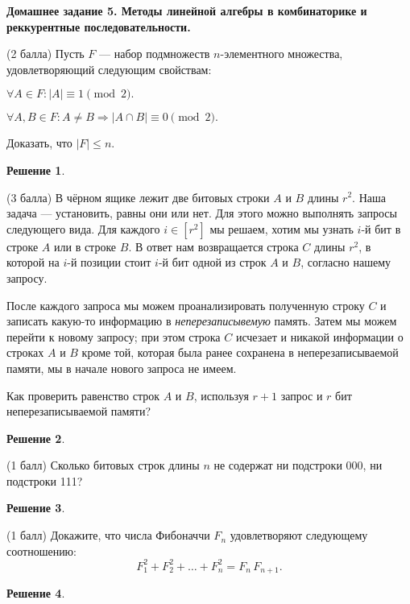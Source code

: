 \documentclass[12pt,fleqn,a4paper]{article}
\newtheorem*{solution}{Решение}
\newenvironment{task}[2] {
	\noindent\fbox{\bf {#1} {#2}.}
}{
}
\newcommand{\mytitle}[2] {
  \begin{center}
      \bf {#1} {#2}.
  \end{center}
}
\let\origenumerate\enumerate
\let\origendenumerate\endenumerate
\renewenvironment{enumerate}{\origenumerate[topsep = 0pt, noitemsep]}{\origendenumerate}
\begin{document}
	\mytitle{Домашнее задание 5.}{Методы линейной алгебры в комбинаторике и реккурентные последовательности}
	\begin{task}{DM}{54}
		(2 балла) Пусть $F$ — набор подмножеств $n$-элементного множества, удовлетворяющий следующим свойствам: 
		        \begin{enumerate}
		                \item $\forall A \in F: |A| \equiv 1 \pmod{2}.$
		                \item $\forall A, B \in F: A \neq B \Rightarrow |A \cap B| \equiv 0 \pmod{2}.$
		        \end{enumerate}
		
		        Доказать, что $|F| \leq n$.
	\end{task}
	\begin{solution}
	\end{solution}

	\begin{task}{DM}{55}
		(3 балла) В чёрном ящике лежит две битовых строки $A$ и $B$ длины $r^2$. Наша задача — установить, равны они или нет.
		Для этого можно выполнять запросы следующего вида. 
		Для каждого $i \in [r^2]$ мы решаем, хотим мы узнать $i$-й бит в строке $A$ или в строке $B$. 
		В ответ нам возвращается строка $C$ длины $r^2$, в которой на $i$-й позиции стоит $i$-й 
		бит одной из строк $A$ и $B$, согласно нашему запросу.
		
		После каждого запроса мы можем проанализировать полученную строку $C$ и записать какую-то информацию в {\em неперезаписывемую} память. Затем мы можем перейти к новому запросу;
		при этом строка $C$ исчезает и никакой информации о строках $A$ и $B$ кроме той, которая была ранее сохранена в неперезаписываемой памяти, мы в начале нового запроса не имеем.
		
		Как проверить равенство строк $A$ и $B$, используя $r+1$ запрос и $r$ бит неперезаписываемой памяти?
	\end{task}
	\begin{solution}
	\end{solution}

	\begin{task}{DM}{56}
		(1 балл) Сколько битовых строк длины $n$ не содержат ни подстроки 000, ни подстроки 111?
	\end{task}
	\begin{solution}
	\end{solution}

	\begin{task}{DM}{57}
		(1 балл) Докажите, что числа Фибоначчи $F_n$ удовлетворяют следующему соотношению:
		$$F_1^2+F_2^2+\ldots+ F_n^2=F_n\, F_{n+1}.$$
	\end{task}
	\begin{solution}
	\end{solution}
\end{document}
